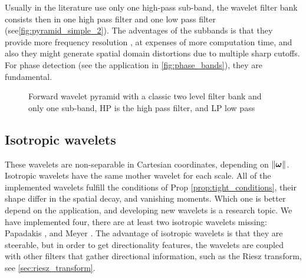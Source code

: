 Usually in the literature use only one high-pass sub-band, the wavelet filter bank consists then in one high pass filter and one low pass filter (see\autoref{fig:pyramid_simple_2}). The adventages of the subbands is that they provide more frequency resolution \cite{held_steerable_2010}, at expenses of more computation time, and also they might generate spatial domain distortions due to multiple sharp cutoffs. For phase detection (see the application in \autoref{fig:phase_bands}), they are fundamental.
\begin{figure}[H]
  \centering
  
  \caption{Forward wavelet pyramid with a classic two level filter bank and only one sub-band, HP is the high pass filter, and LP low pass}
  \label{fig:pyramid_simple_2}
\end{figure}


\subsection{Isotropic wavelets}
\label{sub:isotropic_wavelets}
These wavelets are non-separable in Cartesian coordinates, depending on $\norm{\bm{\omega}}$. Isotropic wavelets have the same mother wavelet for each scale. All of the implemented wavelets fulfill the conditions of Prop \ref{prop:tight_conditions}, their shape differ in the spatial decay, and vanishing moments. Which one is better depend on the application, and developing new wavelets is a research topic. We have implemented four, there are at least \cite{unser_steerable_2011} two isotropic wavelets missing: Papadakis \cite{romero_geometry_2009}, and Meyer \cite{daubechies_ten_1992}.
The advantage of isotropic wavelets is that they are steerable, but in order to get directionality features, the wavelets are coupled with other filters that gather directional information, such as the Riesz transform, see \autoref{sec:riesz_transform}.

